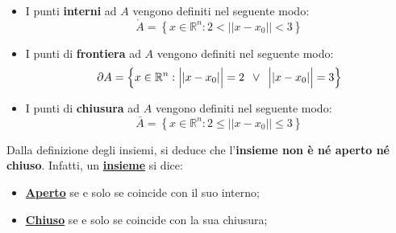 \documentclass[a4paper]{article}
\begin{document}
	\begin{itemize}
		\item I punti \textbf{interni} ad $A$ vengono definiti nel seguente modo:
		\begin{equation*}
			\mathring{A} = \left\{x \in \mathbb{R}^{n} : 2 < \Big||x-x_{0}|\Big| < 3\right\}
		\end{equation*}
		
		\item I punti di \textbf{frontiera} ad $A$ vengono definiti nel seguente modo:
		\begin{equation*}
			\partial A = \left\{x \in \mathbb{R}^{n} : \Big||x-x_{0}|\Big| = 2 \hspace{0.5em} \lor \hspace{0.5em} \Big||x-x_{0}|\Big| = 3 \right\}
		\end{equation*}
		
		\item I punti di \textbf{chiusura} ad $A$ vengono definiti nel seguente modo:
		\begin{equation*}
			\bar{A} = \left\{x \in \mathbb{R}^{n} : 2 \le \Big||x-x_{0}|\Big| \le 3\right\}
		\end{equation*}
	\end{itemize}

	\noindent
	Dalla definizione degli insiemi, si deduce che l'\textbf{insieme non è né aperto né chiuso}. Infatti, un \textcolor{Red3}{\textbf{\underline{insieme}}} si dice:
	
	\begin{itemize}[label=-]
		\item \textcolor{Red3}{\textbf{\underline{Aperto}}} se e solo se coincide con il suo interno;
		
		\item \textcolor{Red3}{\textbf{\underline{Chiuso}}} se e solo se coincide con la sua chiusura;
	\end{itemize}
\end{document}

